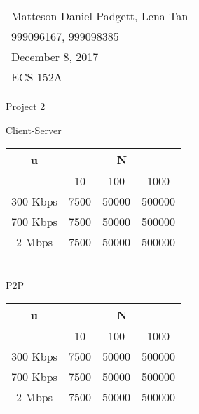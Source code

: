 \documentclass{article}
\begin{document}
	\null\hfill\begin{tabular}[t]{l@{}}
	Matteson Daniel-Padgett, Lena Tan\\
	999096167, 999098385\\
	December 8, 2017\\
	ECS 152A
\end{tabular}
	
\begin{center}	
\sc \Large Project 2
\end{center}	

\noindent Client-Server\\
\begin{tabular}{|c | c | c | c|}
	\hline
	u & \multicolumn{3}{|c|}{N} \\
	\hline
	 & 10 & 100 & 1000 \\
	\hline
	300 Kbps & 7500 & 50000 & 500000 \\
	\hline
	700 Kbps & 7500 & 50000 & 500000 \\
	\hline
	2 Mbps & 7500 & 50000 & 500000 \\
	\hline
\end{tabular} \\

\noindent P2P\\
\begin{tabular}{|c | c | c | c|}
	\hline
	u & \multicolumn{3}{|c|}{N} \\
	\hline
	& 10 & 100 & 1000 \\
	\hline
	300 Kbps & 7500 & 50000 & 500000 \\
	\hline
	700 Kbps & 7500 & 50000 & 500000 \\
	\hline
	2 Mbps & 7500 & 50000 & 500000 \\
	\hline
\end{tabular} \\

\part{}	
	
\section{}

\section{}

\section{}
\end{document}
